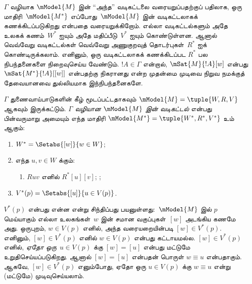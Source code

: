 \documentclass[../../../include/open-logic-section]{subfiles}
\begin{document}


$\Gamma$ வழியாக $\mModel{M}$ இன் ``அந்த'' வடிகட்டலை வரையறுப்பதற்குப்
பதிலாக, ஒரு மாதிரி~$\mModel{M^*}$ எப்போது~$\mModel{M}$ இன் வடிகட்டலாகக்
கணக்கிடப்படுகிறது என்பதை வரையறுக்கிறோம். எல்லா வடிகட்டல்களும் அதே
உலகக் கணம்~$W^*$ ஐயும் அதே மதிப்பீடு~$V^*$ ஐயும் கொண்டுள்ளன. ஆனால்
வெவ்வேறு வடிகட்டல்கள் வெவ்வேறு அணுகுறவுத் தொடர்புகள்~$R^*$ ஐக்
கொண்டிருக்கலாம். எனினும், ஒரு வடிகட்டலாகக் கணக்கிடப்பட $R^*$ பல
நிபந்தனைகளை நிறைவுசெய்ய வேண்டும். $!A \in \Gamma$ என்றால்,
$\mSat{M}{!A}[w]$ என்பது $\mSat{M^*}{!A}[{[w]}]$ என்பதற்கு நிகரானது என்ற
முதன்மை முடிவை நிறுவ நமக்குத் தேவையானவை துல்லியமாக இந்நிபந்தனைகளே.

\begin{defn}
  $\Gamma$ துணைவாய்பாடுகளின் கீழ் மூடப்பட்டதாகவும்
  $\mModel{M} = \tuple{W, R, V}$ ஆகவும் இருக்கட்டும்.
  \emph{$\Gamma$ வழியான $\mModel{M}$ இன் வடிகட்டல்} என்பது பின்வருமாறு
  அமையும் எந்த மாதிரி $\mModel{M^*} = \tuple{W^*,R^*,V^*}$ உம் ஆகும்:
  \begin{enumerate}
  \item $W^* = \Setabs{[w]}{w \in W}$;
  \item {}%
    எந்த $u,v \in W$ க்கும்:
    \begin{enumerate}
    \item {}%
      $Ruv$ எனில் $R^*[u][v]$;
    ;
    \end{enumerate}
  \item $V^*(p) = \Setabs{[u]}{u \in V(p)}$.
  \end{enumerate}
\end{defn}

$V^*(p)$ என்பது என்ன என்று சிந்திப்பது பயனுள்ளது:~$\mModel{M}$ இல் $p$
மெய்யாகும் எல்லா உலகங்கள்~$w$ இன் சமான வகுப்புகள்~$[w]$ அடங்கிய கணமே
அது. ஒருபுறம், $w \in V(p)$ எனில், அந்த வரையறையின்படி $[w] \in V^*(p)$.
எனினும், $[w] \in V^*(p)$ எனில் $w \in V(p)$ என்பது கட்டாயமல்ல.
$[w] \in V^*(p)$ எனில், \emph{ஏதோ ஒரு}~$u \in V(p)$ க்கு
$[w] = [u]$ என்பது மட்டுமே உறுதிசெய்யப்படுகிறது. ஆனால் $[w] = [u]$
என்பதன் பொருள் $w \equiv u$ என்பதாகும். ஆகவே, $[w] \in V^*(p)$ எனும்போது,
ஏதோ ஒரு $u \in V(p)$ க்கு $w \equiv u$ என்று (மட்டுமே) முடிவுசெய்யலாம்.
\end{document}
